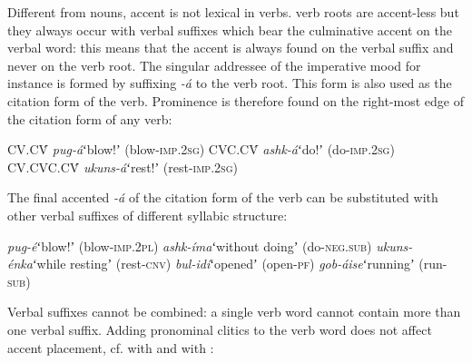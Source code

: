 \documentclass[output=paper]{LSP/langsci}
\begin{document}
Different from nouns, accent is not lexical in verbs.  verb roots are accent-less but they always occur with verbal suffixes which bear the culminative accent on the verbal word: this means that the accent is always found on the verbal suffix and never on the verb root. The singular addressee of the imperative mood for instance is formed by suffixing \textit{-á} to the verb root. This form is also used as the citation form of the verb. Prominence is therefore found on the right-most edge of the citation form of any verb:
\begin{exe}
\ex \begin{xlist}
\ex CV.CV́ \hspace{12mm}\textit{pug-á}\hspace{12mm}ʻblow!ʼ (blow-\textsc{imp}.2\textsc{sg})
\ex CVC.CV́ \hspace{9mm}\textit{ashk-á}\hspace{11mm}ʻdo!ʼ (do-\textsc{imp}.2\textsc{sg})
\ex CV.CVC.CV́ \hspace{3mm}\textit{ukuns-á}\hspace{10mm}ʻrest!ʼ (rest-\textsc{imp}.2\textsc{sg})
\end{xlist}
\end{exe}
The final accented \textit{-á} of the citation form of the verb can be substituted with other verbal suffixes of different syllabic structure:
\begin{exe}
\ex \begin{xlist}
\ex \textit{pug-é}\hspace{13mm}ʻblow!ʼ (blow-\textsc{imp}.2\textsc{pl}) \label{ex:Petrollino:pugé}
\ex \textit{ashk-íma}\hspace{7mm}ʻwithout doingʼ (do-\textsc{neg}.\textsc{sub})
\ex \textit{ukuns-énka}\hspace{4mm}ʻwhile restingʼ (rest-\textsc{cnv}) \label{ex:Petrollino:uskenka}
\ex \textit{bul-idí}\hspace{12mm}ʻopenedʼ (open-\textsc{pf})
\ex \textit{gob-áise}\hspace{10mm}ʻrunningʼ (run-\textsc{sub})
\end{xlist} \label{ex:Petrollino:grammaticalstress}
\end{exe}
Verbal suffixes cannot be combined: a single verb word cannot contain more than one verbal suffix. Adding pronominal  clitics to the verb word does not affect accent placement, cf.  with  and  with :
\end{document}
